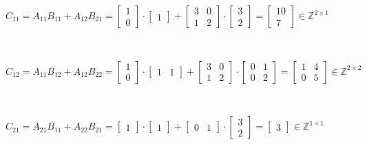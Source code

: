 \documentclass{article}
\begin{document}
$C_{11} = A_{11}B_{11} + A_{12}B_{21} =  
\begin{bmatrix}
    1 \\
    0
\end{bmatrix}
\cdot
\begin{bmatrix}
    1
\end{bmatrix}
+
\begin{bmatrix}
    3 & 0 \\
    1 & 2
\end{bmatrix}
\cdot
\begin{bmatrix}
    3 \\
    2
\end{bmatrix} 
=
\begin{bmatrix}
    10 \\
    7
\end{bmatrix} \in \mathbb{Z}^{2\times 1}$

\

$C_{12} = A_{11}B_{12} + A_{12}B_{22} =  
\begin{bmatrix}
    1 \\
    0    
\end{bmatrix}
\cdot
\begin{bmatrix}
    1 & 1
\end{bmatrix}
+
\begin{bmatrix}
    3 & 0 \\
    1 & 2
\end{bmatrix}
\cdot
\begin{bmatrix}
    0 & 1 \\
    0 & 2
\end{bmatrix}
=
\begin{bmatrix}
    1 & 4 \\
    0 & 5
\end{bmatrix} \in \mathbb{Z}^{2\times 2}$

\

$C_{21} = A_{21}B_{11} + A_{22}B_{21} =  
\begin{bmatrix}
    1    
\end{bmatrix}
\cdot
\begin{bmatrix}
    1
\end{bmatrix}
+
\begin{bmatrix}
    0 & 1
\end{bmatrix}
\cdot
\begin{bmatrix}
    3 \\
    2
\end{bmatrix}
=
\begin{bmatrix}
    3
\end{bmatrix} \in \mathbb{Z}^{1\times 1}$
\end{document}
